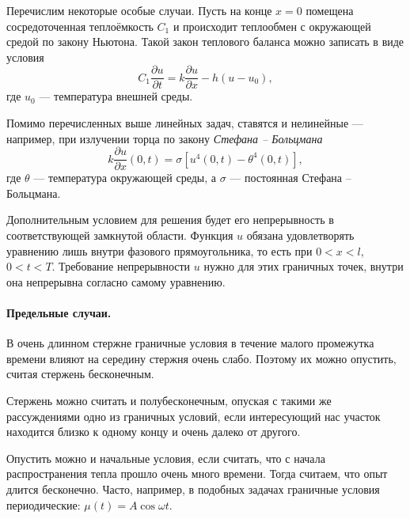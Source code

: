Перечислим некоторые особые случаи. Пусть на конце $ x = 0 $ помещена
сосредоточенная теплоёмкость $ C_1 $ и происходит теплообмен с окружающей средой
по закону Ньютона. Такой закон теплового баланса можно записать в виде условия
\[
    C_1 \frac{\partial u}{\partial t} = k \frac{\partial u}{\partial x} -
    h(u-u_0),
\]
где $ u_0 $ --- температура внешней среды.


Помимо перечисленных выше линейных задач, ставятся и нелинейные --- например, при
излучении торца по закону \emph{Стефана -- Больцмана} 
\[
  k \frac{\partial u}{\partial x}(0, t) = \sigma [u^4(0, t) - \theta^4(0,t)],
\]
где $ \theta $ --- температура окружающей среды, а $ \sigma $ --- постоянная
Стефана -- Больцмана.

Дополнительным условием для решения будет его непрерывность в соответствующей
замкнутой области. Функция $ u $ обязана удовлетворять уравнению лишь внутри фазового прямоугольника, то
есть при $ 0 < x < l $, $ 0 < t < T $. Требование непрерывности $ u
$ нужно для этих граничных точек, внутри она непрерывна согласно самому уравнению.

\paragraph{Предельные случаи.} В очень длинном стержне граничные условия в
течение малого промежутка времени влияют на середину стержня очень слабо.
Поэтому их можно опустить, считая стержень бесконечным.

Стержень можно считать и полубесконечным, опуская с такими же рассуждениями одно
из граничных условий, если интересующий нас участок находится близко к одному
концу и очень далеко от другого.

Опустить можно и начальные условия, если считать, что с начала распространения
тепла прошло очень много времени. Тогда считаем, что опыт длится бесконечно.
Часто, например, в подобных задачах граничные
условия периодические: $ \mu(t) = A\cos\omega t $.


